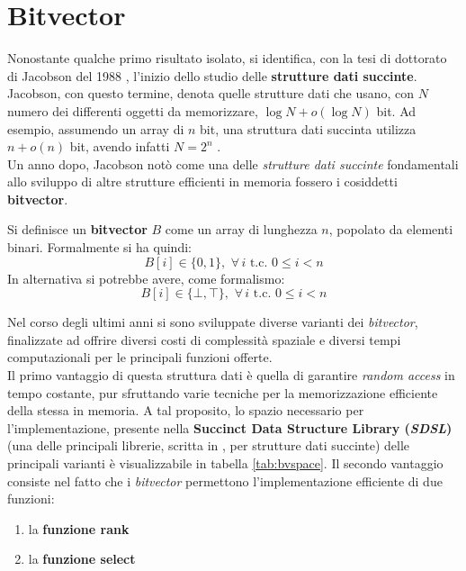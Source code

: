 \section{Bitvector}
\label{bvsec}
Nonostante qualche primo risultato isolato, si identifica, con la tesi di
dottorato di Jacobson 
del 1988 \cite{succinct}, l'inizio dello studio delle \textbf{strutture dati
  succinte}. Jacobson, con questo termine, denota quelle strutture dati che
usano, con $N$ numero dei differenti oggetti da memorizzare, $\log N+o(\log N)$
bit. Ad esempio, assumendo un array di $n$ bit, una struttura dati succinta
utilizza $n+o(n)$ bit, avendo infatti $N=2^n$ \cite{navarro}.\\
Un anno dopo, Jacobson \cite{jacobson} notò come una delle \textit{strutture
  dati succinte} fondamentali allo sviluppo di altre strutture efficienti in
memoria fossero i cosiddetti \textbf{bitvector}.
\begin{definizione}
  Si definisce un \textbf{bitvector} $B$ come un array di lunghezza $n$,
  popolato da elementi binari. Formalmente si ha quindi:
  \begin{equation}
    \label{eq:bvdef1}
    B[i]\in\{0,1\},\,\,\forall\, i \mbox{ t.c. } 0\leq i < n
  \end{equation}
  In alternativa si potrebbe avere, come formalismo:
  \begin{equation}
    \label{eq:bvdef2}
    B[i]\in\{\bot,\top\},\,\,\forall\, i \mbox{ t.c. } 0\leq i < n
  \end{equation}
\end{definizione}
Nel corso degli ultimi anni si sono sviluppate diverse varianti dei
\textit{bitvector}, finalizzate ad offrire diversi costi di complessità spaziale
e 
diversi tempi computazionali per le principali funzioni offerte.\\
Il primo vantaggio di questa struttura dati è quella di garantire \textit{random
  access} in tempo costante, pur 
sfruttando varie tecniche per la memorizzazione efficiente della stessa in
memoria. A tal proposito, lo spazio necessario per l'implementazione, presente
nella \textbf{Succinct Data Structure Library (\textit{SDSL})} \cite{sdsl} (una
delle principali librerie, scritta in , per strutture dati
succinte) delle principali varianti è visualizzabile in tabella 
\ref{tab:bvspace}. Il secondo vantaggio consiste nel fatto che i
\textit{bitvector} permettono l'implementazione efficiente di due funzioni: 
\begin{enumerate}
  \item la \textbf{funzione rank}
  \item la \textbf{funzione select}
\end{enumerate}
